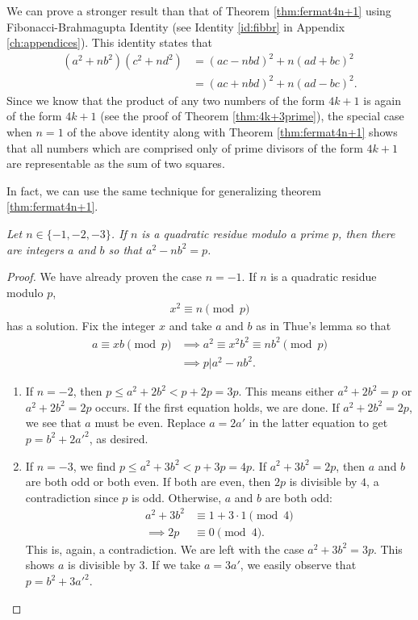 \documentclass{subfile}
\begin{document}
	\begin{remark}
		We can prove a stronger result than that of Theorem \autoref{thm:fermat4n+1} using Fibonacci-Brahmagupta Identity (see Identity \ref{id:fibbr} in Appendix \ref{ch:appendices}). This identity states that
		\begin{align*}
			(a^2+nb^2)(c^2+nd^2)&=(ac-nbd)^2+n(ad+bc)^2\\
			&=(ac+nbd)^2+n(ad-bc)^2.
		\end{align*}
	Since we know that the product of any two numbers of the form $4k+1$ is again of the form $4k+1$ (see the proof of Theorem \ref{thm:4k+3prime}), the special case when $n=1$ of the above identity along with Theorem \ref{thm:fermat4n+1} shows that all numbers which are comprised only of prime divisors of the form $4k+1$ are representable as the sum of two squares. 
	\end{remark}
	In fact, we can use the same technique for generalizing theorem \autoref{thm:fermat4n+1}.
	\begin{theorem}\label{thm:gen4n+1}\slshape
		Let $n\in\{-1,-2,-3\}$. If $n$ is a quadratic residue modulo a prime $p$, then there are integers $a$ and $b$ so that $a^2-nb^2=p$.
	\end{theorem}
	
	\begin{proof}
		We have already proven the case $n=-1$. If $n$ is a quadratic residue modulo $p$, 
		\begin{align*}
			x^2\equiv n\pmod p
		\end{align*}
		has a solution. Fix the integer $x$ and take $a$ and $b$ as in Thue's lemma so that
		\begin{align*}
			a \equiv xb\pmod p &\implies a^2 \equiv x^2b^2 \equiv nb^2\pmod p\\
			& \implies p  |a^2-nb^2.
		\end{align*}
		
		\begin{enumerate}
			\item If $n=-2$, then $p\leq a^2+2b^2<p+2p=3p$. This means either $a^2+2b^2=p$ or $a^2+2b^2=2p$ occurs. If the first equation holds, we are done. If $a^2+2b^2=2p$, we see that $a$ must be even. Replace $a=2a'$ in the latter equation to get $p=b^2+2a'^2$, as desired.
			\item If $n=-3$, we find $p\leq a^2+3b^2<p+3p=4p$. If $a^2+3b^2=2p$, then $a$ and $b$ are both odd or both even. If both are even, then $2p$ is divisible by $4$, a contradiction since $p$ is odd. Otherwise, $a$ and $b$ are both odd:
			\begin{align*}
				a^2+3b^2 & \equiv1+3\cdot 1\pmod 4\\
				\implies 2p	 & \equiv 0 \pmod 4.
			\end{align*}
			This is, again, a contradiction. We are left with the case $a^2+3b^2=3p$. This shows $a$ is divisible by $3$. If we take $a=3a'$, we easily observe that $p=b^2+3a'^2$.
		\end{enumerate}
	\end{proof}
\end{document}
